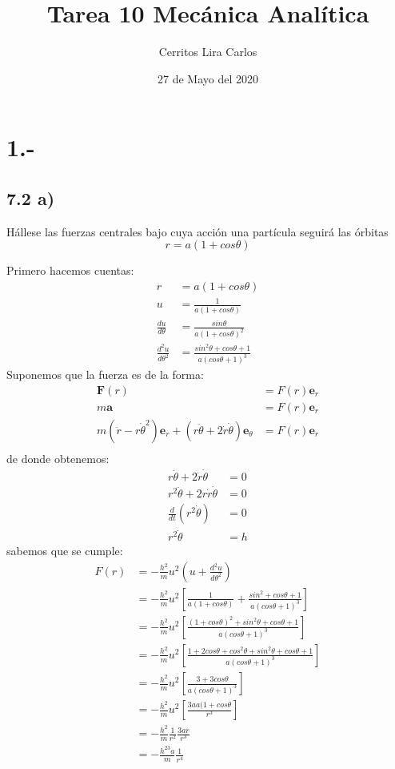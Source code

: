 \documentclass{article}
\title{Tarea 10 Mecánica Analítica}
\author{Cerritos Lira Carlos}
\date{27 de Mayo del 2020}
\begin{document}
\maketitle
\section*{1.-}
\subsection*{7.2 a)}
Hállese las fuerzas centrales bajo cuya acción una partícula seguirá las órbitas
\[ r = a(1+cos \theta)\]
\begin{tcolorbox}[breakable]
    Primero hacemos cuentas:
    \begin{align*}
        r &= a(1+cos\theta) \\
        u &= \frac{1}{a(1+cos\theta)} \\
        \frac{du}{d\theta} &= \frac{sin\theta}{a(1+cos\theta)^2} \\
        \frac{d^2u}{d\theta^2} &= \frac{sin^2\theta + cos\theta + 1}{a(cos\theta+1)^3} 
    \end{align*}
    Suponemos que la fuerza es de la forma:
    \begin{align*}
        \bm{F}(r) &= F(r)\bm{e}_r \\
        m\bm{a} &= F(r)\bm{e}_r \\
        m(\ddot{r}-r\dot{\theta}^2)\bm{e}_r + (r\ddot{\theta} + 2\dot{r} \dot{\theta})\bm{e}_\theta &= F(r)\bm{e}_r \\ 
    \end{align*}
    de donde obtenemos:
    \begin{align*}
        r\ddot{\theta} + 2\dot{r}\dot{\theta} &= 0 \\
        r^2\ddot{\theta} + 2r\dot{r}\dot{\theta} &= 0 \\
        \frac{d}{dt}(r^2\dot{\theta}) &= 0 \\
        r^2\dot{\theta} &= h
    \end{align*}
    sabemos que se cumple:
    \begin{align*}
        F(r) &= -\frac{h^2}{m}u^2(u+\tfrac{d^2u}{d\theta^2}) \\
        &= -\frac{h^2}{m}u^2\left[\frac{1}{a(1+cos\theta)}+\frac{sin^2+cos\theta + 1}{a(cos\theta+1)^3}\right] \\
        &= -\frac{h^2}{m}u^2\left[\frac{(1+cos\theta)^2+sin^2\theta+cos\theta+1}{a(cos\theta+1)^3}\right] \\
        &= -\frac{h^2}{m}u^2\left[\frac{1+2cos\theta+cos^2\theta+sin^2\theta+cos\theta+1}{a(cos\theta+1)^3}\right] \\
        &= -\frac{h^2}{m}u^2\left[\frac{3+3cos\theta}{a(cos\theta+1)^3} \right] \\
        &= -\frac{h^2}{m}u^2\left[\frac{3aa(1+cos\theta}{r^3} \right] \\
        &= -\frac{h^2}{m}\frac{1}{r^2}\frac{3ar}{r^3} \\
        &= -\frac{h^23a}{m}\frac{1}{r^4}
    \end{align*}
\end{tcolorbox}
\end{document}
